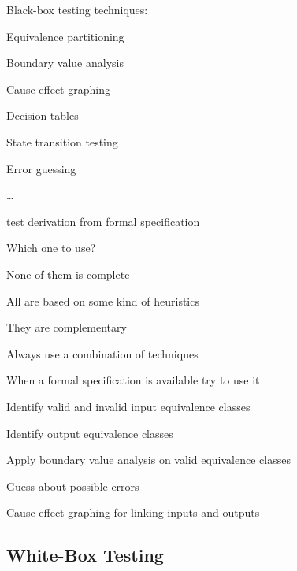 \begin{itemize*}
	\item Black-box testing techniques:
	\begin{itemize*}
		\item Equivalence partitioning
		\item Boundary value analysis
		\item Cause-effect graphing
		\item Decision tables
		\item State transition testing
		\item Error guessing
        \item \ldots
		\begin{itemize*}
			\item test derivation from formal specification
		\end{itemize*}		
	\end{itemize*}
	\item Which one to use?
	\begin{itemize*}
		\item None of them is complete
		\item All are based on some kind of heuristics
		\item They are complementary
	\end{itemize*}
	\item Always use a combination of techniques
	\begin{itemize*}
		\item When a formal specification is available try to use it
		\item Identify valid and invalid input equivalence classes
		\item Identify output equivalence classes
		\item Apply boundary value analysis on valid equivalence classes
		\item Guess about possible errors
		\item Cause-effect graphing for linking inputs and outputs
	\end{itemize*}
\end{itemize*}

\subsection{White-Box Testing}

